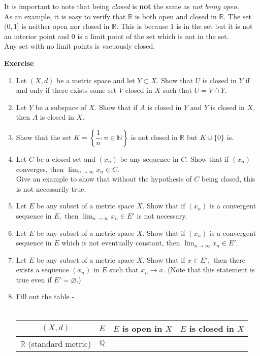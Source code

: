 \documentclass[12pt]{article}
\let\emptyset\varnothing
\newcounter{exercise}
\newcommand{\exercise}{\refstepcounter{exercise}\par\medskip
   {\textbf{Exercise \theexercise }} \rmfamily}
\begin{document}
	It is important to note that being \emph{closed} is \textbf{not} the same as \emph{not being open.}\\
	As an example, it is easy to verify that $\mathbb{R}$ is both open and closed in $\mathbb{R}.$ The set $(0, 1]$ is neither open nor closed in $\mathbb{R}.$ This is because $1$ is in the set but it is not an interior point and $0$ is a limit point of the set which is not in the set.\\
	Any set with no limit points is vacuously closed.\\
	\exercise
	\begin{enumerate}[nosep] 
		\item Let $(X, d)$ be a metric space and let $Y \subset X.$ Show that $U$ is closed in $Y$ if and only if there exists some set $V$ closed in $X$ such that $U = V \cap Y.$
		\item Let $Y$ be a subspace of $X.$ Show that if $A$ is closed in $Y$ and $Y$ is closed in $X,$ then $A$ is closed in $X.$
		\item Show that the set $K = \left\{\dfrac{1}{n} : n \in \mathbb{N}\right\}$ is not closed in $\mathbb{R}$ but $K \cup \{0\}$ is.
		\item Let $C$ be a closed set and $(x_n)$ be any sequence in $C.$ Show that if $(x_n)$ converges, then $\displaystyle\lim_{n\to \infty}x_n \in C.$\\
		Give an example to show that without the hypothesis of $C$ being closed, this is not necessarily true.
		\item Let $E$ be any subset of a metric space $X.$ Show that if $(x_n)$ is a convergent sequence in $E,$ then $\displaystyle\lim_{n\to \infty}x_n \in E'$ {\color{red} is not necessary}.
		\item Let $E$ be any subset of a metric space $X.$ Show that if $(x_n)$ is a convergent sequence in $E$ which is not eventually constant, then $\displaystyle\lim_{n\to \infty}x_n \in E'.$
		\item Let $E$ be any subset of a metric space $X.$ Show that if $x \in E',$ then there exists a sequence $(x_n)$ in $E$ such that $x_n \to x.$ (Note that this statement is true even if $E' = \emptyset.$)
		\item Fill out the table - \\~\\
		\begin{tabular}{|c|c|c|c|}
			\hline
			$(X, d)$ & $E$ & $E$ is open in $X$ & $E$ is closed in $X$\\
			\hline
			$\mathbb{R}$ (standard metric) & $\mathbb{Q}$ & & \\

\end{tabular}
\end{enumerate}
\end{document}
